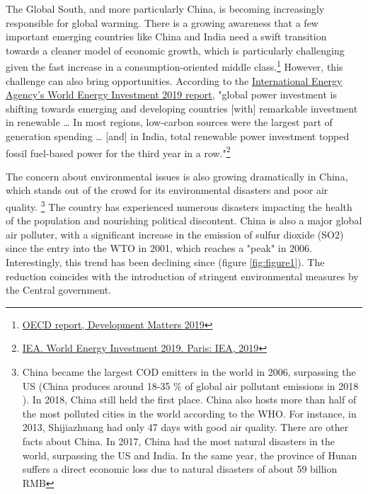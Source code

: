 \documentclass[12pt]{article}
\begin{document}
The Global South, and more particularly China, is becoming increasingly responsible for global warming. There is a growing awareness that a few important emerging countries like China and India need a swift transition towards a cleaner model of economic growth, which is particularly challenging given the fast increase in a consumption-oriented middle class.\footnote{ \href{https://oecd-development-matters.org/2019/06/20/the-global-souths-contribution-to-the-climate-crisis-and-its-potential-solutions/}{OECD report, Development Matters 2019}} However, this challenge can also bring opportunities. According to the \href{https://www.iea.org/wei2019/}{International Energy Agency’s World Energy Investment 2019 report}, "global power investment is shifting towards emerging and developing countries [with] remarkable investment in renewable … In most regions, low-carbon sources were the largest part of generation spending … [and] in India, total renewable power investment topped fossil fuel-based power for the third year in a row."\footnote{ \href{https://drive.google.com/open?id=16ftB1MMwn9drPqVb1b5O51ODzhPQjiW-}{IEA. World Energy Investment 2019. Paris: IEA, 2019}}

The concern about environmental issues is also growing dramatically in China, which stands out of the crowd for its environmental disasters and poor air quality. \footnote{China became the largest COD emitters in the world in 2006, surpassing the US (China produces around 18-35 \% of global air pollutant emissions in 2018 \cite{Hoesly2018-gm}). In 2018, China still held the first place. China also hosts more than half of the most polluted cities in the world according to the WHO. For instance, in 2013, Shijiazhuang had only 47 days with good air quality. There are other facts about China. In 2017, China had the most natural disasters in the world, surpassing the US and India. In the same year, the province of Hunan suffers a direct economic loss due to natural disasters of about 59 billion RMB} The country has experienced numerous disasters impacting the health of the population and nourishing political discontent. China is also a major global air polluter, with a significant increase in the emission of sulfur dioxide (SO2) since the entry into the WTO in 2001, which reaches a "peak" in 2006. Interestingly, this trend has been declining since (figure \ref{fig:figure1}). The reduction coincides with the introduction of stringent environmental measures by the Central government.
\end{document}
